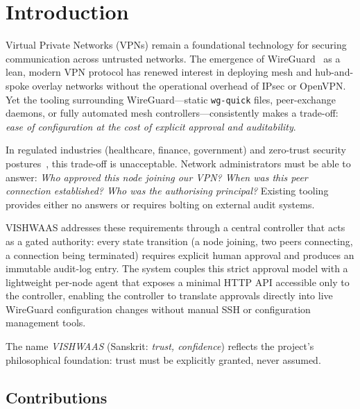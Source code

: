 \documentclass[conference]{IEEEtran}
\begin{document}
\section{Introduction}

Virtual Private Networks (VPNs) remain a foundational technology for securing
communication across untrusted networks. The emergence of
WireGuard~\cite{donenfeld2017wireguard} as a lean, modern VPN protocol has
renewed interest in deploying mesh and hub-and-spoke overlay networks without the
operational overhead of IPsec or OpenVPN. Yet the tooling surrounding
WireGuard---static \texttt{wg-quick} files, peer-exchange daemons, or fully
automated mesh controllers---consistently makes a trade-off: \emph{ease of
configuration at the cost of explicit approval and auditability}.

In regulated industries (healthcare, finance, government) and zero-trust security
postures~\cite{zerotrust}, this trade-off is unacceptable. Network administrators
must be able to answer: \textit{Who approved this node joining our VPN?  When was
this peer connection established?  Who was the authorising principal?}  Existing
tooling provides either no answers or requires bolting on external audit systems.

VISHWAAS addresses these requirements through a central controller that acts as a
gated authority: every state transition (a node joining, two peers connecting, a
connection being terminated) requires explicit human approval and produces an
immutable audit-log entry.  The system couples this strict approval model with a
lightweight per-node agent that exposes a minimal HTTP API accessible only to the
controller, enabling the controller to translate approvals directly into live
WireGuard configuration changes without manual SSH or configuration management
tools.

The name \textit{VISHWAAS} (Sanskrit: \textit{trust, confidence}) reflects the
project's philosophical foundation: trust must be explicitly granted, never
assumed.

\subsection{Contributions}
\end{document}
